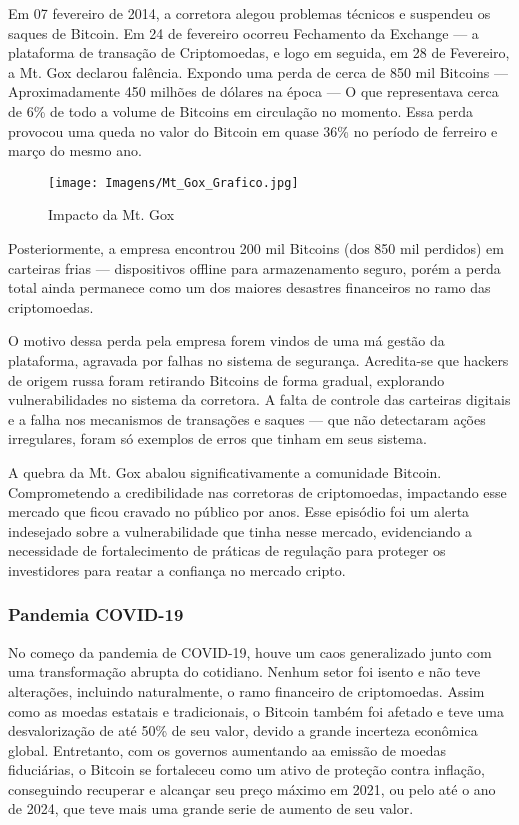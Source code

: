 Em 07 fevereiro de 2014, a corretora alegou problemas técnicos e suspendeu os saques de Bitcoin. Em 24 de fevereiro ocorreu Fechamento da Exchange — a plataforma de transação de Criptomoedas, e logo em seguida, em 28 de Fevereiro, a Mt. Gox declarou falência. Expondo uma perda de cerca de 850 mil Bitcoins — Aproximadamente 450 milhões de dólares na época — O que representava cerca de 6\% de todo a volume de Bitcoins em circulação no momento. Essa perda provocou uma queda no valor do Bitcoin em quase 36\% no período de ferreiro e março do mesmo ano. 

\begin{figure}
    \centering
    \texttt{[image: Imagens/Mt\_Gox\_Grafico.jpg]}
    \caption{Impacto da Mt. Gox}
    \label{fig:Mt. Gox Gráfico}
\end{figure}

Posteriormente, a empresa encontrou 200 mil Bitcoins (dos 850 mil perdidos) em carteiras frias — dispositivos offline para armazenamento seguro, porém a perda total ainda permanece como um dos maiores desastres financeiros no ramo das criptomoedas.

O motivo dessa perda pela empresa forem vindos de uma má gestão da plataforma, agravada por falhas no sistema de segurança. Acredita-se que hackers de origem russa foram retirando Bitcoins de forma gradual, explorando vulnerabilidades no sistema da corretora. A falta de controle das carteiras digitais e a falha nos mecanismos de transações e saques — que não detectaram ações irregulares, foram só exemplos de erros que tinham em seus sistema.

A quebra da Mt. Gox abalou  significativamente a comunidade Bitcoin. Comprometendo a credibilidade nas corretoras de criptomoedas, impactando esse mercado que ficou cravado no público por anos. Esse episódio foi um alerta indesejado sobre a vulnerabilidade que tinha nesse mercado,  evidenciando a necessidade de fortalecimento de práticas de regulação para proteger os investidores para reatar a confiança no mercado cripto.

\subsubsection{\textbf{Pandemia COVID-19}}

No começo da pandemia de COVID-19, houve um caos generalizado junto com uma transformação abrupta do cotidiano. Nenhum setor foi isento e não teve alterações, incluindo naturalmente, o ramo financeiro de criptomoedas. Assim como as moedas estatais e tradicionais, o Bitcoin também foi afetado e teve uma desvalorização de até 50\% de seu valor, devido a grande incerteza econômica global. Entretanto, com os governos aumentando aa emissão de moedas fiduciárias, o Bitcoin se fortaleceu como um ativo de proteção contra inflação, conseguindo recuperar e alcançar seu preço máximo em 2021, ou pelo até o ano de 2024, que teve mais uma grande serie de aumento de seu valor.

